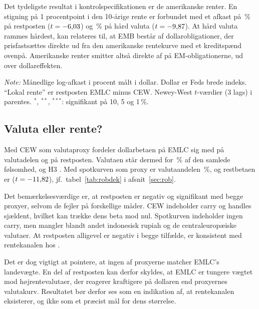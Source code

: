 \documentclass[11pt,a4paper]{article}
\begin{document}
Det tydeligste resultat i kontrolspecifikationen er de amerikanske renter. En stigning på 1 procentpoint i den 10-årige rente er forbundet med et afkast på \RateLok\,\% på restposten ($t=-6{,}03$) og \RateEMB\,\% på hård valuta ($t=-9{,}87$). At hård valuta rammes hårdest, kan relateres til, at EMB består af dollarobligationer, der prisfastsættes direkte ud fra den amerikanske rentekurve med et kreditspænd ovenpå. Amerikanske renter smitter altså direkte af på EM-obligationerne, ud over dollareffekten.

\begin{table}[!htb]
\centering
\small
\begin{threeparttable}
\caption{Dollarbetaer}
\label{tab:betas}

\begin{tablenotes}\footnotesize
\item \textit{Note:} Månedlige log-afkast i procent målt i dollar. Dollar er Feds brede indeks. ``Lokal rente'' er restposten EMLC minus CEW. Newey-West $t$-værdier (3 lags) i parentes. $^{*}$, $^{**}$, $^{***}$: signifikant på 10, 5 og 1\,\%.
\end{tablenotes}
\end{threeparttable}
\end{table}

\subsection{Valuta eller rente?}

Med CEW som valutaproxy fordeler dollarbetaen på EMLC sig med \BetaCEW{} på valutadelen og \BetaLok{} på restposten. Valutaen står dermed for \ValutaAndel\,\% af den samlede følsomhed, og H3 \DomIII. Med spotkurven som proxy er valutaandelen \SpotAndel\,\%, og restbetaen er \SpotRest{} ($t=-11{,}82$), jf.\ tabel~\ref{tab:robdek} i afsnit~\ref{sec:rob}.

Det bemærkelsesværdige er, at restposten er negativ og signifikant med begge proxyer, selvom de fejler på forskellige måder. CEW indeholder carry og handles sjældent, hvilket kan trække dens beta mod nul. Spotkurven indeholder ingen carry, men mangler blandt andet indonesisk rupiah og de centraleuropæiske valutaer. At restposten alligevel er negativ i begge tilfælde, er konsistent med rentekanalen hos \citet{hofmann2020}.

Det er dog vigtigt at pointere, at ingen af proxyerne matcher EMLC's landevægte. En del af restposten kan derfor skyldes, at EMLC er tungere vægtet mod højrentevalutaer, der reagerer kraftigere på dollaren end proxyernes valutakurv. Resultatet bør derfor ses som en indikation af, at rentekanalen eksisterer, og ikke som et præcist mål for dens størrelse.
\end{document}
